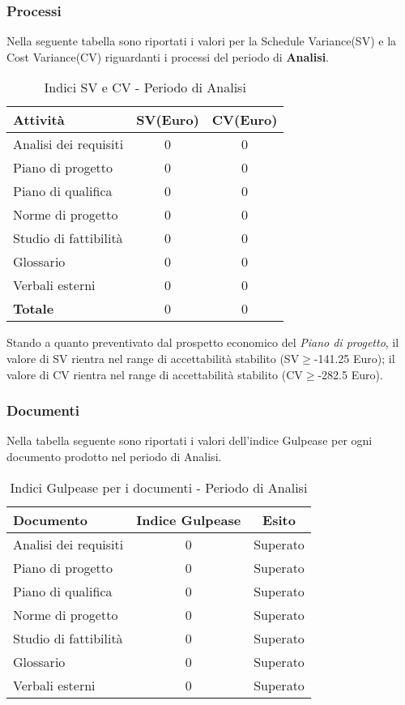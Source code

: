       \subsubsection{Processi}
      Nella seguente tabella sono riportati i valori per la Schedule Variance(SV) e la Cost Variance(CV) riguardanti i processi del periodo di \textbf{Analisi}.\\
      \begin{table}[H]
        \centering
        \begin{tabular}{|l|c|c|}
          \hline
          \textbf{Attività} &\textbf{SV}(Euro)  &\textbf{CV}(Euro) \\
          \hline
          Analisi dei requisiti  &0 &0  \\
          Piano di progetto &0  &0\\
          Piano di qualifica  &0  &0\\
          Norme di progetto &0  &0 \\
          Studio di fattibilità &0  &0  \\
          Glossario &0  &0  \\
          Verbali esterni &0  &0  \\
          \hline
          \textbf{Totale} &0  &0  \\
          \hline
        \end{tabular}
        \caption{Indici SV e CV - Periodo di Analisi}
      \end{table}
      Stando a quanto preventivato dal prospetto economico del \emph{Piano di progetto}, il valore di SV rientra nel range di accettabilità stabilito (SV\(\geq\)-141.25 Euro);
      il valore di CV rientra nel range di accettabilità stabilito (CV\(\geq\)-282.5 Euro).
      \subsubsection{Documenti}
      Nella tabella seguente sono riportati i valori dell'indice Gulpease per ogni documento prodotto nel periodo di Analisi.\\
      \begin{table}[H]
        \centering
        \begin{tabular}{|l|c|c|}
          \hline
          \textbf{Documento} &\textbf{Indice Gulpease} &\textbf{Esito}\\
          \hline
          Analisi dei requisiti &0  &Superato \\
          Piano di progetto &0  &Superato \\
          Piano di qualifica  &0  &Superato \\
          Norme di progetto &0  &Superato \\
          Studio di fattibilità &0  &Superato \\
          Glossario &0  &Superato  \\
          Verbali esterni &0  &Superato \\
          \hline
        \end{tabular}
        \caption{Indici Gulpease per i documenti - Periodo di Analisi}
      \end{table}

